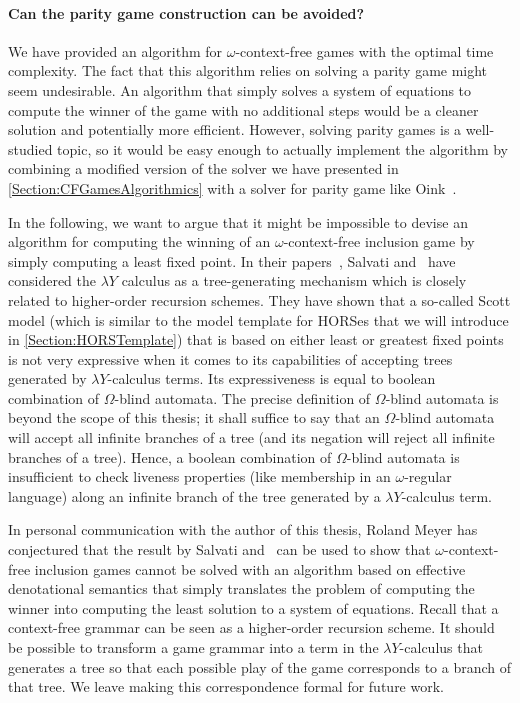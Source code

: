 \documentclass[../../diss.tex]{subfiles}
\begin{document}
\paragraph{Can the parity game construction can be avoided?}

We have provided an algorithm for $\omega$-context-free games with the optimal time complexity.
The fact that this algorithm relies on solving a parity game might seem undesirable.
An algorithm that simply solves a system of equations to compute the winner of the game with no additional steps would be a cleaner solution and potentially more efficient.
However, solving parity games is a well-studied topic, so it would be easy enough to actually implement the algorithm by combining a modified version of the solver we have presented in \cref{Section:CFGamesAlgorithmics} with a solver for parity game like Oink~\cite{Dijk18}.

In the following, we want to argue that it might be impossible to devise an algorithm for computing the winning of an $\omega$-context-free inclusion game by simply computing a least fixed point.
In their papers~\cite{SalvatiW15,SalvatiW15b}, Salvati and \Walu~have considered the $\lambda Y$ calculus as a tree-generating mechanism which is closely related to higher-order recursion schemes.
They have shown that a so-called Scott model (which is similar to the model template for HORSes that we will introduce in \cref{Section:HORSTemplate}) that is based on either least or greatest fixed points is not very expressive when it comes to its capabilities of accepting trees generated by $\lambda Y$-calculus terms.
Its expressiveness is equal to boolean combination of $\Omega$-blind automata.
The precise definition of $\Omega$-blind automata is beyond the scope of this thesis; it shall suffice to say that an $\Omega$-blind automata will accept all infinite branches of a tree (and its negation will reject all infinite branches of a tree).
Hence, a boolean combination of $\Omega$-blind automata is insufficient to check liveness properties (like membership in an $\omega$-regular language) along an infinite branch of the tree generated by a $\lambda Y$-calculus term.

In personal communication with the author of this thesis, Roland Meyer has conjectured that the result by Salvati and \Walu~can be used to show that $\omega$-context-free inclusion games cannot be solved with an algorithm based on effective denotational semantics that simply translates the problem of computing the winner into computing the least solution to a system of equations.
Recall that a context-free grammar can be seen as a higher-order recursion scheme.
It should be possible to transform a game grammar into a term in the $\lambda Y$-calculus that generates a tree so that each possible play of the game corresponds to a branch of that tree.
We leave making this correspondence formal for future work.
\end{document}
